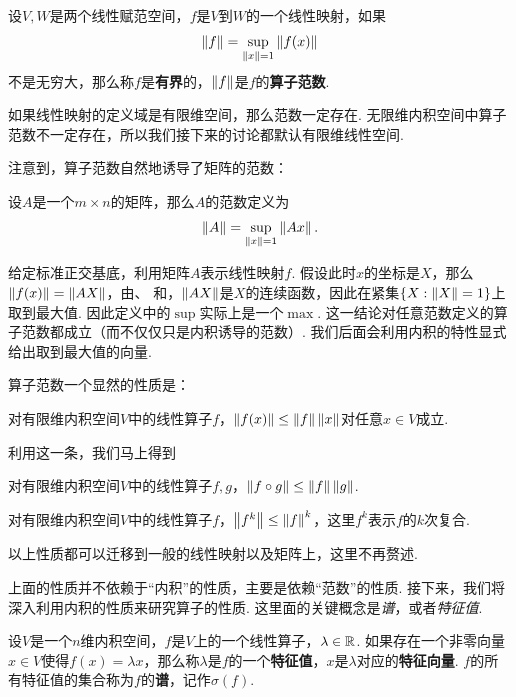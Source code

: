 \begin{definition}[线性映射的范数]
    设$V,W$是两个线性赋范空间，$f$是$V$到$W$的一个线性映射，如果
    \[\left\|f\right\|=\sup_{\left\|x\right\|=1}\left\|f(x)\right\|\]
    不是无穷大，那么称$f$是\textbf{有界}的，$\left\|f\right\|$是$f$的\textbf{算子范数}. 
\end{definition}

如果线性映射的定义域是有限维空间，那么范数一定存在. 无限维内积空间中算子范数不一定存在，所以我们接下来的讨论都默认有限维线性空间. 

注意到，算子范数自然地诱导了矩阵的范数：
\begin{definition}[矩阵范数]
    设$A$是一个$m\times n$的矩阵，那么$A$的范数定义为
    \[\left\|A\right\|=\sup_{\left\|x\right\|=1}\left\|Ax\right\|.\]
\end{definition}

给定标准正交基底，利用矩阵$A$表示线性映射$f$. 假设此时$x$的坐标是$X$，那么$\left\|f(x)\right\|=\left\|AX\right\|$，由、 和，$\left\|AX\right\|$是$X$的连续函数，因此在紧集$\{X:\left\|X\right\|=1\}$上取到最大值. 因此定义中的$\sup$实际上是一个$\max$. 这一结论对任意范数定义的算子范数都成立（而不仅仅只是内积诱导的范数）. 我们后面会利用内积的特性显式给出取到最大值的向量. 

算子范数一个显然的性质是：

\begin{proposition}\label{prop:norm-ineq}
对有限维内积空间$V$中的线性算子$f$，$\left\|f(x)\right\|\leq \left\|f\right\|\left\|x\right\|$对任意$x\in V$成立. 
\end{proposition}

利用这一条，我们马上得到

\begin{proposition}\label{prop:operator-norm-ineq}
对有限维内积空间$V$中的线性算子$f,g$，$\left\|f\circ g\right\|\leq \left\|f\right\|\left\|g\right\|$.
\end{proposition}

\begin{proposition}\label{prop:operator-power-norm-ineq}
    对有限维内积空间$V$中的线性算子$f$，$\left\|f^k\right\|\leq \left\|f\right\|^k$，这里$f^k$表示$f$的$k$次复合. 
\end{proposition}

以上性质都可以迁移到一般的线性映射以及矩阵上，这里不再赘述. 

上面的性质并不依赖于“内积”的性质，主要是依赖“范数”的性质. 接下来，我们将深入利用内积的性质来研究算子的性质. 这里面的关键概念是\emph{谱}，或者\emph{特征值}. 

\begin{definition}
设$V$是一个$n$维内积空间，$f$是$V$上的一个线性算子，$\lambda\in\mathbb{R}$. 如果存在一个非零向量$x\in V$使得$f(x)=\lambda x$，那么称$\lambda$是$f$的一个\textbf{特征值}，$x$是$\lambda$对应的\textbf{特征向量}. $f$的所有特征值的集合称为$f$的\textbf{谱}，记作$\sigma(f)$. 
\end{definition}

